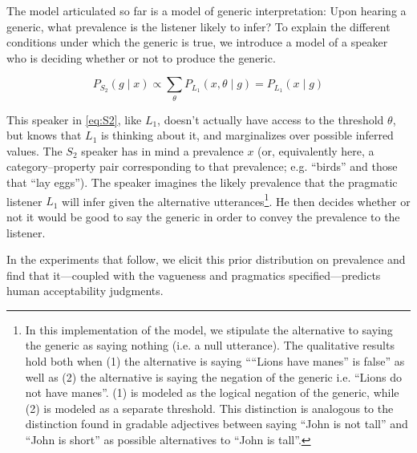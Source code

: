 \documentclass[10pt,letterpaper]{article}
\begin{document}
The model articulated so far is a model of generic interpretation: Upon hearing a generic, what prevalence is the listener likely to infer? 
To explain the different conditions under which the generic is true, we introduce a model of a speaker who is deciding whether or not to produce the generic. 

\begin{equation} 
P_{S_{2}}(g \mid x) \propto  \sum_{\theta} P_{L_{1}}(x , \theta \mid g) =  P_{L_{1}}(x \mid g)
\label{eq:S2}
\end{equation}

This speaker in \eqref{eq:S2}, like $L_{1}$, doesn't actually have access to the threshold $\theta$, but knows that $L_{1}$ is thinking about it, and marginalizes over possible inferred values. 
The $S_{2}$ speaker has in mind a prevalence $x$ (or, equivalently here, a category--property pair corresponding to that prevalence; e.g. ``birds'' and those that ``lay eggs''). 
The speaker imagines the likely prevalence that the pragmatic listener $L_{1}$ will infer given the alternative utterances\footnote{In this implementation of the model, we stipulate the alternative to saying the generic as saying nothing (i.e. a null utterance). The qualitative results hold both when (1) the alternative is saying ````Lions have manes'' is false'' as well as (2) the alternative is saying the negation of the generic i.e. ``Lions do not have manes''. (1) is modeled as the logical negation of the generic, while (2) is modeled as a separate threshold. This distinction is analogous to the distinction found in gradable adjectives between saying ``John is not tall'' and ``John is short'' as possible alternatives to ``John is tall''.}. 
He then decides whether or not it would be good to say the generic in order to convey the prevalence to the listener.
 
In the experiments that follow, we elicit this prior distribution on prevalence and find that it---coupled with the vagueness and pragmatics specified---predicts human acceptability judgments.
 
\end{document}
